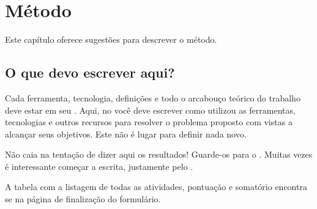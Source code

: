 \chapter{Método}
\label{Metodo}
\indent
Este capítulo oferece sugestões para descrever o método.

\section{O que devo escrever aqui?}%

Cada ferramenta, tecnologia, definições e todo o arcabouço teórico do trabalho deve estar em seu .
Aqui, no  você deve escrever como utilizou as ferramentas, tecnologias e outros recursos para resolver o problema proposto com vistas a alcançar seus objetivos.
Este não é lugar para definir nada novo.


Não caia na tentação de dizer aqui os resultados! Guarde-os para o . Muitas vezes é interessante começar a escrita, justamente pelo .

\selectfont%
A tabela com a listagem de todas as atividades, pontuação e somatório encontra se na página de finalização do formulário.

